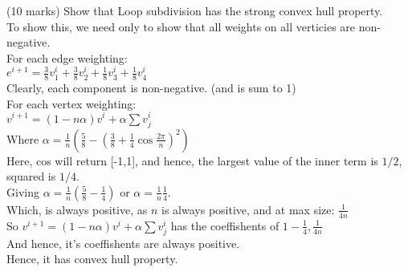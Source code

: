 (10 marks) Show that Loop subdivision has the strong convex hull property. \\

To show this, we need only to show that all weights on all verticies are non-negative. \\
For each edge weighting:\\ 
$e^{i+1} = \frac{3}{8}v_1^i + \frac{3}{8} v_2^i + \frac{1}{8} v_3^i + \frac{1}{8} v_4^i$ \\
Clearly, each component is non-negative. (and is sum to 1)\\
For each vertex weighting: \\
$v^{i+1} = (1 - n \alpha )v^i + \alpha \sum v^i_j $ \\
Where $\alpha = \frac{1}{n} ( \frac{5}{8} - ( \frac{3}{8} + \frac{1}{4} \cos \frac{2 \pi }{n})^2 )$ \\
Here, cos will return [-1,1], and hence, the largest value of the inner term is $1/2$, squared is $1/4$. \\
Giving $\alpha = \frac{1}{n} ( \frac{5}{8} - \frac{1}{4} )$ or $\alpha = \frac{1}{n} \frac{1}{4}$. \\
Which, is always positive, as $n$ is always positive, and at max size: $\frac{1}{4 n}$ \\
So $v^{i+1} = (1 - n \alpha)v^i + \alpha \sum v^i_j$  has the coeffishents of $1-\frac{1}{4} , \frac{1}{4n}$  \\
And hence, it's coeffishents are always positive. \\
Hence, it has convex hull property.

